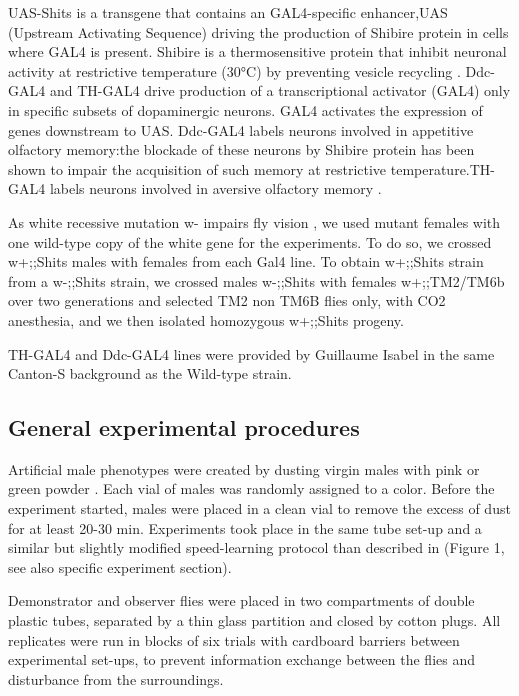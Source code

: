 \documentclass[a4paper, 12pt]{article}
\begin{document}
	UAS-Shits is a transgene that contains an GAL4-specific enhancer,UAS (Upstream Activating Sequence) driving the production of Shibire protein in cells where GAL4 is present. Shibire is a thermosensitive protein that inhibit neuronal activity at restrictive temperature (30°C) by preventing vesicle recycling \parencite{kitamoto_conditional_2001}. Ddc-GAL4 and TH-GAL4 drive production of a transcriptional activator (GAL4) only in specific subsets of dopaminergic neurons. GAL4 activates the expression of genes downstream to UAS. Ddc-GAL4 labels neurons involved in appetitive olfactory memory:the blockade of these neurons by Shibire protein has been shown to impair the acquisition of such memory at restrictive temperature.TH-GAL4 labels neurons involved in aversive olfactory memory \parencite{liu_subset_2012}.
	
	As white recessive mutation w- impairs fly vision \parencite{gotz_optomotorische_1964}, we used mutant females with one wild-type copy of the white gene for the experiments. To do so, we crossed w+;;Shits males with females from each Gal4 line. To obtain w+;;Shits strain from a w-;;Shits strain, we crossed males w-;;Shits with females w+;;TM2/TM6b over two generations and selected TM2 non TM6B flies only, with CO2 anesthesia, and we then isolated homozygous w+;;Shits progeny.
	
	TH-GAL4 and Ddc-GAL4 lines were provided by Guillaume Isabel in the same Canton-S background as the Wild-type strain.
	
	\subsection{General experimental procedures}
	
	Artificial male phenotypes were created by dusting virgin males with pink or green powder \parencite{mery_public_2009}. Each vial of males was randomly assigned to a color. Before the experiment started, males were placed in a clean vial to remove the excess of dust for at least 20-30 min. Experiments took place in the same tube set-up and a similar but slightly modified speed-learning protocol than described in \textcite{dagaeff_drosophila_2016} (Figure 1, see also specific experiment section).
	
	Demonstrator and observer flies were placed in two compartments of double plastic tubes, separated by a thin glass partition and closed by cotton plugs. All replicates were run in blocks of six trials with cardboard barriers between experimental set-ups, to prevent information exchange between the flies and disturbance from the surroundings. 
	
\end{document}
